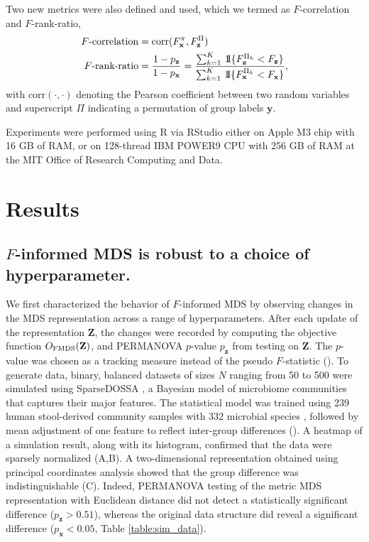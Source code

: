 \documentclass[10pt,letterpaper]{article}
\newcommand{\1}{{\rm 1}\kern-0.24em{\rm I}}
\begin{document}
Two new metrics were also defined and used, which we termed as $F$-correlation and $F$-rank-ratio,
\begin{equation}
\begin{aligned}
    F\text{-correlation} &= \text{corr}(F_\mathbf{x}^\pi, F_\mathbf{z}^\Pi) \\
    F\text{-rank-ratio} &= \frac{1-p_\mathbf{z}}{1-p_\mathbf{x}} = \frac{\sum_{k=1}^K\,\1\{F_\mathbf{z}^{\Pi_k} < F_\mathbf{z}\}}{\sum_{k=1}^K\,\1\{F_\mathbf{x}^{\Pi_k} < F_\mathbf{x}\}},
    \label{eq:def_f_metrics}
\end{aligned}
\end{equation}
with $\text{corr}(\cdot,\cdot)$ denoting the Pearson coefficient between two random variables and superscript $\Pi$ indicating a permutation of group labels $\mathbf{y}$.

Experiments were performed using R via RStudio either on Apple M3 chip with 16 GB of RAM, or on 128-thread IBM POWER9 CPU with 256 GB of RAM at the MIT Office of Research Computing and Data.



\section*{Results}
\subsection*{$F$-informed MDS is robust to a choice of hyperparameter.}
We first characterized the behavior of $F$-informed MDS by observing changes in the MDS representation across a range of hyperparameters. After each update of the representation $\mathbf{Z}$, the changes were recorded by computing the objective function $O_{\rm FMDS}(\mathbf{Z})$, and PERMANOVA $p$-value $p_\mathbf{z}$ from testing on $\mathbf{Z}$. The $p$-value was chosen as a tracking measure instead of the pseudo $F$-statistic (). To generate data, binary, balanced datasets of sizes $N$ ranging from 50 to 500 were simulated using SparseDOSSA \cite{Ma21}, a Bayesian model of microbiome communities that captures their major features. The statistical model was trained using 239 human stool-derived community samples with 332 microbial species \cite{Lloyd17}, followed by mean adjustment of one feature to reflect inter-group differences (). A heatmap of a simulation result, along with its histogram, confirmed that the data were sparsely normalized (A,B). A two-dimensional representation obtained using principal coordinates analysis showed that the group difference was indistinguishable (C). Indeed, PERMANOVA testing of the metric MDS representation with Euclidean distance did not detect a statistically significant difference ($p_\mathbf{z}>0.51$), whereas the original data structure did reveal a significant difference ($p_\mathbf{x}<0.05$, Table \ref{table:sim_data}).
\end{document}
